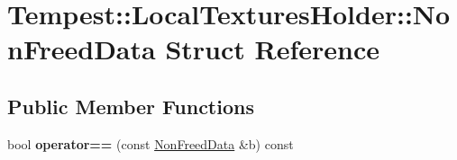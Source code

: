 \hypertarget{struct_tempest_1_1_local_textures_holder_1_1_non_freed_data}{\section{Tempest\+:\+:Local\+Textures\+Holder\+:\+:Non\+Freed\+Data Struct Reference}
\label{struct_tempest_1_1_local_textures_holder_1_1_non_freed_data}
}
\subsection*{Public Member Functions}
\begin{DoxyCompactItemize}
\item 
\hypertarget{struct_tempest_1_1_local_textures_holder_1_1_non_freed_data_a8fe349c8ea7b769d23e7a60a631ad5d2}{bool {\bfseries operator==} (const \hyperlink{struct_tempest_1_1_local_textures_holder_1_1_non_freed_data}{Non\+Freed\+Data} \&b) const }\label{struct_tempest_1_1_local_textures_holder_1_1_non_freed_data_a8fe349c8ea7b769d23e7a60a631ad5d2}

\end{DoxyCompactItemize}
